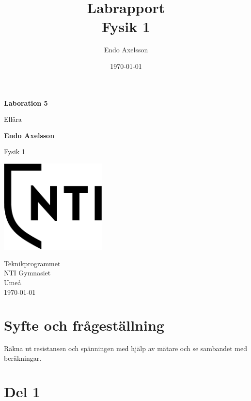 \documentclass[11pt]{article}
\title{Labrapport \\ \small Fysik 1}
\author{Endo Axelsson}
\date{\today}
\begin{document}
    \begin{titlepage}
        \begin{center}
            \vspace*{1cm}

            \Huge
            \textbf{Laboration 5}

            \vspace{0.5cm}
            \LARGE
            Ellära

            \vspace{1.5cm}

            \textbf{Endo Axelsson}

            \vfill


            Fysik 1

            \vspace{0.8cm}

            \includegraphics[width=0.4\textwidth]{../NTI Gymnasiet_Symbol_print_svart.png}

            \Large
            Teknikprogrammet\\
            NTI Gymnasiet\\
            Umeå\\
            \today

        \end{center}
    \end{titlepage}
    \section{Syfte och frågeställning}
Räkna ut resistansen och spänningen med hjälp av mätare och se sambandet med beräkningar.

    \section{Del 1}
\end{document}
